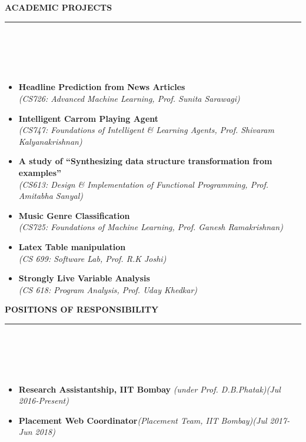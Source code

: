 \documentclass[a4paper,10pt]{article}
\newcommand{\lsep}{-0.5cm}
\newcommand{\resheading}[1]{{\small
        {
            \begin{minipage}
                {0.975\textwidth}\textbf{{\textsc{#1 \vphantom{p\^{E}} }}}
                \\[-0.3cm]
                \hrule
            \end{minipage}
            \\[-0.5cm]
        }
 }}
\begin{document}
\resheading{\textbf{\large ACADEMIC PROJECTS}}\\[\lsep] 
\\[-0.4cm]
\begin{itemize}
\item \textbf{Headline Prediction from News Articles} \\
     \emph{(CS726: Advanced Machine Learning, Prof. Sunita Sarawagi)}
    \\[-0.6cm]

\item \textbf{Intelligent Carrom Playing Agent}
 \\ {\emph{(CS747: Foundations of Intelligent \& Learning Agents, Prof. Shivaram Kalyanakrishnan)}}
    \\ [-0.6cm]

\item \textbf{A study of ``Synthesizing data structure transformation from examples''}
 \\ {\emph{(CS613: Design \& Implementation of Functional Programming, Prof. Amitabha Sanyal)}}
    \\ [-0.6cm]

\item \textbf{Music Genre Classification}
 \\ {\emph{(CS725: Foundations of Machine Learning, Prof. Ganesh Ramakrishnan)}}
    \\ [-0.6cm]
    
\item \textbf{Latex Table manipulation}
 \\ {\emph{(CS 699: Software Lab, Prof. R.K Joshi)}}
     \\ [-0.6cm]

\item \textbf{Strongly Live Variable Analysis}
\\ {\emph{(CS 618: Program Analysis, Prof. Uday Khedkar)}}
    \\ [-0.6cm]

\end{itemize}
\vspace{0.1cm}

\resheading{\textbf{\large POSITIONS OF RESPONSIBILITY}}\\[\lsep] 
\\[-0.4cm]
\begin{itemize}
    \item \textbf{Research Assistantship, IIT Bombay }\emph{(under Prof. D.B.Phatak)}\hfill {\emph{(Jul 2016-Present)}} \\[-0.6cm]
    \item \textbf{Placement Web Coordinator}\emph{(Placement Team, IIT Bombay)}\hfill {\emph{(Jul 2017-Jun 2018)}} \\[-0.6cm]
\end{itemize}
\end{document}
